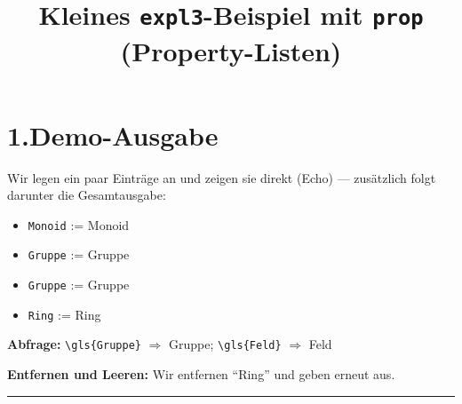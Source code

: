\documentclass[a4paper,11pt]{article}
\title{Kleines \texttt{expl3}-Beispiel mit \texttt{prop} (Property-Listen)}
\author{}
\date{}
\begin{document}
\maketitle

\section*{1.\;Demo-Ausgabe}
Wir legen ein paar Einträge an und zeigen sie direkt (Echo) — zusätzlich folgt darunter die Gesamtausgabe:

\begin{itemize}
  \item {}%
        \quad \texttt{Monoid} := \gls{Monoid}
  \item {}%
        \quad \texttt{Gruppe} := \gls{Gruppe}
  \item {}%
        \quad \texttt{Gruppe} := \gls{Gruppe}
  \item {}%
        \quad \texttt{Ring} := \gls{Ring}
\end{itemize}

\printglossary

\medskip
\noindent\textbf{Abfrage:} \verb|\gls{Gruppe}| $\Rightarrow$ \gls{Gruppe}; \quad
\verb|\gls{Feld}| $\Rightarrow$ \gls{Feld} %

\medskip
\noindent\textbf{Entfernen und Leeren:}
Wir entfernen \enquote{Ring} und geben erneut aus.
 \par
\printglossary

\clearglossary \par
\printglossary

\bigskip
\noindent\rule{\linewidth}{0.4pt}
\end{document}
